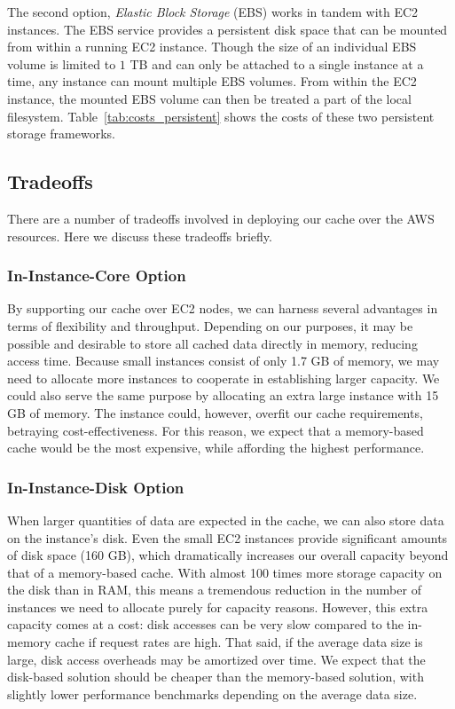 The second option, \emph{Elastic Block Storage} (EBS) works in tandem with EC2
instances. The EBS service provides a persistent disk space that can be mounted
from within a running EC2 instance. Though the size of an individual EBS volume
is limited to $1$ TB and can only be attached to a single instance at a time,
any instance can mount multiple EBS volumes. From within the EC2 instance, the
mounted EBS volume can then be treated a part of the local filesystem.
Table~\ref{tab:costs_persistent} shows the costs of these two persistent
storage frameworks.

\subsection{Tradeoffs} %
\label{sub:aws_tradeoffs}
There are a number of tradeoffs involved in deploying our cache over the AWS
resources. Here we discuss these tradeoffs briefly.

\subsubsection{In-Instance-Core Option} %
\label{subsub:in_instance_core}
By supporting our cache over EC2 nodes, we can harness several advantages in
terms of flexibility and throughput. Depending on our purposes, it may be
possible and desirable to store all cached data directly in memory, reducing
access time. Because small instances consist of only 1.7 GB of memory, we may
need to allocate more instances to cooperate in establishing larger capacity.
We could also serve the same purpose by allocating an extra large instance with
15 GB of memory. The instance could, however, overfit our cache requirements,
betraying cost-effectiveness. For this reason, we expect that a memory-based
cache would be the most expensive, while affording the highest performance.

\subsubsection{In-Instance-Disk Option} %
\label{subsub:in_instance_disk}
When larger quantities of data are expected in the cache, we can also store
data on the instance's disk. Even the small EC2 instances provide significant
amounts of disk space (160 GB), which dramatically increases our overall
capacity beyond that of a memory-based cache. With almost 100 times more
storage capacity on the disk than in RAM, this means a tremendous reduction in
the number of instances we need to allocate purely for capacity reasons.
However, this extra capacity comes at a cost: disk accesses can be very slow
compared to the in-memory cache if request rates are high. That said, if the
average data size is large, disk access overheads may be amortized over time.
We expect that the disk-based solution should be cheaper than the memory-based
solution, with slightly lower performance benchmarks depending on the average
data size.

